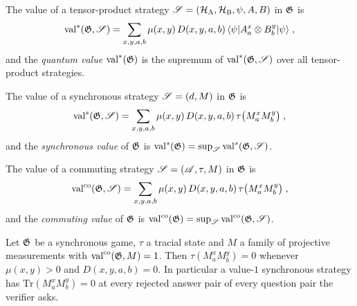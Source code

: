 \begin{definition}
\label{def:q-value}
\leanok
\qlib{}
The value of a tensor-product strategy $\mathscr{S} = (\mathcal{H}_{\textsc{A}},\mathcal{H}_{\textsc{B}},\psi,A,B)$ in $\mathfrak{G}$ is
\begin{equation*}
  \mathrm{val}^*(\mathfrak{G}, \mathscr{S}) = \sum_{x, y, a, b} \mu(x,y)\, D(x,y,a,b)\,
  \langle\psi| A^x_a \otimes B^y_b |\psi\rangle\;,
\end{equation*}
and the \emph{quantum value} $\mathrm{val}^*(\mathfrak{G})$ is the supremum of
$\mathrm{val}^*(\mathfrak{G}, \mathscr{S})$ over all tensor-product strategies. 
\end{definition}



\begin{definition}
\label{def:sync-value}
\leanok
\qlib{}
The value of a synchronous strategy $\mathscr{S} = (d, M)$ in $\mathfrak{G}$ is
\begin{equation*}
  \mathrm{val}^{s}(\mathfrak{G}, \mathscr{S}) = \sum_{x, y, a, b} \mu(x,y)\, D(x,y,a,b)\,
  \tau\bigl(M^x_a M^y_b\bigr)\;,
\end{equation*}
and the \emph{synchronous value} of $\mathfrak{G}$ is $\mathrm{val}^{s}(\mathfrak{G}) = \sup_{\mathscr{S}}
\mathrm{val}^{s}(\mathfrak{G}, \mathscr{S})$.
\end{definition}


\begin{definition}
\label{def:commuting-value}
\leanok
\qlib{}
The value of a commuting strategy $\mathscr{S} = (\mathscr{A}, \tau, M)$ in $\mathfrak{G}$ is
\begin{equation*}
  \mathrm{val}^{\mathrm{co}}(\mathfrak{G}, \mathscr{S}) = \sum_{x, y, a, b} \mu(x,y)\, D(x,y,a,b)\,
  \tau\bigl(M^x_a M^y_b\bigr)\;,
\end{equation*}
and the \emph{commuting value} of $\mathfrak{G}$ is $\mathrm{val}^{\mathrm{co}}(\mathfrak{G}) = \sup_{\mathscr{S}}
\mathrm{val}^{\mathrm{co}}(\mathfrak{G}, \mathscr{S})$.
\end{definition}


\begin{lemma}
\label{lem:perfect-rejects-nothing}
\leanok
Let $\mathfrak{G}$ be a synchronous game, $\tau$ a tracial state and $M$ a family of projective
measurements with $\mathrm{val}^{\mathrm{co}}(\mathfrak{G}, M) = 1$. Then $\tau(M^x_a M^y_b) = 0$ whenever
$\mu(x,y) > 0$ and $D(x,y,a,b) = 0$. In particular a value-$1$ synchronous strategy has
$\mathrm{Tr}(M^x_a M^y_b) = 0$ at every rejected answer pair of every question pair the verifier asks.
\end{lemma}

